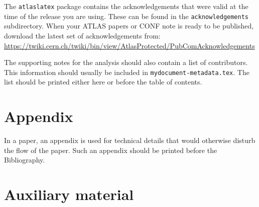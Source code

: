 \documentclass[UKenglish]{latex/atlasdoc}
\begin{document}
%

The \texttt{atlaslatex} package contains the acknowledgements that were valid 
at the time of the release you are using. These can be found in the
\texttt{acknowledgements} subdirectory.
When your ATLAS papers or CONF note is ready to be published,
download the latest set of acknowledgements from:\\
\url{https://twiki.cern.ch/twiki/bin/view/AtlasProtected/PubComAcknowledgements}

The supporting notes for the analysis should also contain a list of contributors.
This information should usually be included in \texttt{mydocument-metadata.tex}.
The list should be printed either here or before the table of contents.


\clearpage
\appendix
\part*{Appendix}

In a paper, an appendix is used for technical details that would otherwise disturb the flow of the paper.
Such an appendix should be printed before the Bibliography.


\printbibliography
%
%

\clearpage
{}

\clearpage
\appendix
\part*{Auxiliary material}
\end{document}
